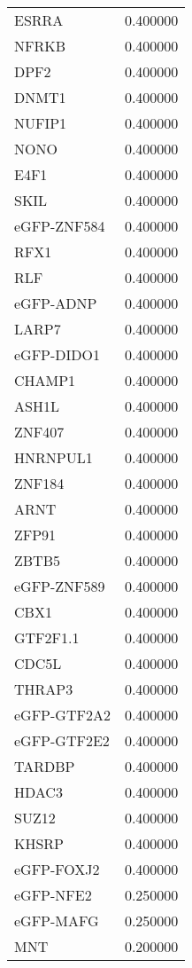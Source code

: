 \begin{longtable}{lr}
           ESRRA &  0.400000 \\
           NFRKB &  0.400000 \\
            DPF2 &  0.400000 \\
           DNMT1 &  0.400000 \\
          NUFIP1 &  0.400000 \\
            NONO &  0.400000 \\
            E4F1 &  0.400000 \\
            SKIL &  0.400000 \\
     eGFP-ZNF584 &  0.400000 \\
            RFX1 &  0.400000 \\
             RLF &  0.400000 \\
       eGFP-ADNP &  0.400000 \\
           LARP7 &  0.400000 \\
      eGFP-DIDO1 &  0.400000 \\
          CHAMP1 &  0.400000 \\
           ASH1L &  0.400000 \\
          ZNF407 &  0.400000 \\
        HNRNPUL1 &  0.400000 \\
          ZNF184 &  0.400000 \\
            ARNT &  0.400000 \\
           ZFP91 &  0.400000 \\
           ZBTB5 &  0.400000 \\
     eGFP-ZNF589 &  0.400000 \\
            CBX1 &  0.400000 \\
        GTF2F1.1 &  0.400000 \\
           CDC5L &  0.400000 \\
          THRAP3 &  0.400000 \\
     eGFP-GTF2A2 &  0.400000 \\
     eGFP-GTF2E2 &  0.400000 \\
          TARDBP &  0.400000 \\
           HDAC3 &  0.400000 \\
           SUZ12 &  0.400000 \\
           KHSRP &  0.400000 \\
      eGFP-FOXJ2 &  0.400000 \\
       eGFP-NFE2 &  0.250000 \\
       eGFP-MAFG &  0.250000 \\
             MNT &  0.200000 \\

\end{longtable}
